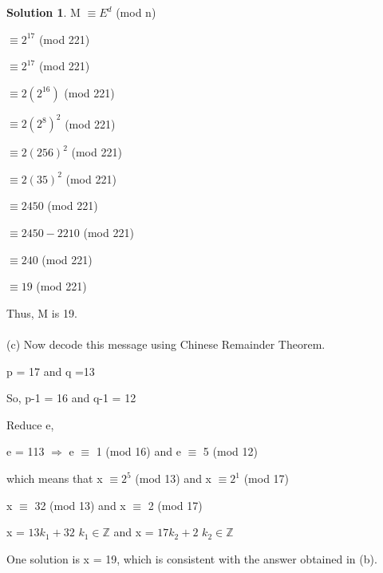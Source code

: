 \documentclass{article}
\theoremstyle{definition}
\newtheorem*{solution}{Solution}
\begin{document}
\begin{solution}
M \(\equiv E^d\) (mod n)

\(\equiv 2^{17}\) (mod 221)

\(\equiv 2^{17}\) (mod 221)

\(\equiv 2(2^{16})\) (mod 221)

\(\equiv 2(2^{8})^{2}\) (mod 221)

\(\equiv 2(256)^{2}\) (mod 221)

\(\equiv 2(35)^{2}\) (mod 221)

\(\equiv 2450\) (mod 221)

\(\equiv 2450-2210\) (mod 221)

\(\equiv 240\) (mod 221)

\(\equiv 19\) (mod 221)

Thus, M is 19.\\\\

(c) Now decode this message using Chinese Remainder Theorem.

p = 17 and q =13

So, p-1 = 16 and q-1 = 12

Reduce e,

e = 113 \(\Rightarrow\) e \(\equiv\) 1 (mod 16) and e \(\equiv\) 5 (mod 12)

which means that x \(\equiv 2^5\) (mod 13) and x \(\equiv 2^1\) (mod 17)

x \(\equiv\) 32 (mod 13) and x \(\equiv\) 2 (mod 17)

x = \(13k_1 + 32 \) \(k_1 \in \mathbb{Z}\) and x = \(17k_2 + 2 \) \(k_2 \in \mathbb{Z}\)

One solution is x = 19, which is consistent with the answer obtained in (b).






\end{solution}
\end{document}
